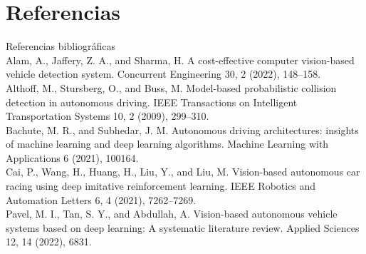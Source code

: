 \documentclass[8pt]{beamer}
\begin{document}
    \section{Referencias}
    \begin{frame}{Referencias bibliográficas}
        \\[1] Alam, A., Jaffery, Z. A., and Sharma, H. A cost-effective computer vision-based vehicle
        detection system. Concurrent Engineering 30, 2 (2022), 148–158.
        \\[2] Althoff, M., Stursberg, O., and Buss, M. Model-based probabilistic collision detection in
        autonomous driving. IEEE Transactions on Intelligent Transportation Systems 10, 2 (2009),
        299–310.
        \\[3] Bachute, M. R., and Subhedar, J. M. Autonomous driving architectures: insights of
        machine learning and deep learning algorithms. Machine Learning with Applications 6
        (2021), 100164.
        \\[4] Cai, P., Wang, H., Huang, H., Liu, Y., and Liu, M. Vision-based autonomous car racing
        using deep imitative reinforcement learning. IEEE Robotics and Automation Letters 6, 4
        (2021), 7262–7269.
        \\[5] Pavel, M. I., Tan, S. Y., and Abdullah, A. Vision-based autonomous vehicle systems
        based on deep learning: A systematic literature review. Applied Sciences 12, 14 (2022),
        6831.

    \end{frame}
\end{document}
